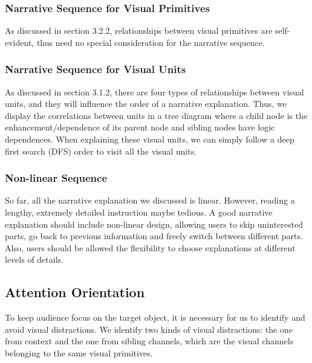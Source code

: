 \subsubsection{Narrative Sequence for Visual Primitives}
As discussed in section 3.2.2, relationships between visual primitives are self-evident, thus need no special consideration for the narrative sequence. 

\subsubsection{Narrative Sequence for Visual Units} 
As discussed in section 3.1.2, there are four types of relationships between visual units, and they will influence the order of a narrative explanation. Thus, we display the correlations between units in a tree diagram where a child node is the enhancement/dependence of its parent node and sibling nodes have logic dependences. When explaining these visual units, we can simply follow a deep first search (DFS) order to visit all the visual units.  

\subsubsection{Non-linear Sequence}
So far, all the narrative explanation we discussed is linear. However, reading a lengthy, extremely detailed instruction maybe tedious. A good narrative explanation should include non-linear design, allowing users to skip uninterested parts, go back to previous information and freely switch between different parts. Also, users should be allowed the flexibility to choose explanations at different levels of details. 

\subsection{Attention Orientation}
To keep audience focus on the target object, it is necessary for us to identify and avoid visual distractions. 
We identify two kinds of visual distractions: the one from context and the one from sibling channels, which are the visual channels belonging to the same visual primitives. 

